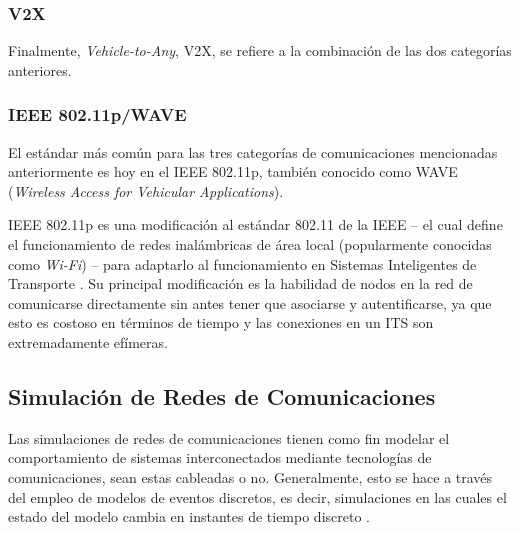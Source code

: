 \subsubsection{V2X}

Finalmente, \emph{Vehicle-to-Any}, V2X, se refiere a la combinación de las dos categorías anteriores.

\subsubsection{IEEE 802.11p/WAVE}\label{sec:its_comms:wave}

El estándar más común para las tres categorías de comunicaciones mencionadas anteriormente es hoy en el IEEE 802.11p, también conocido como WAVE (\emph{Wireless Access for Vehicular Applications}).

IEEE 802.11p es una modificación al estándar 802.11 de la IEEE -- el cual define el funcionamiento de redes inalámbricas de área local (popularmente conocidas como \emph{Wi-Fi}) -- para adaptarlo al funcionamiento en Sistemas Inteligentes de Transporte \autocite{80211wave}. Su principal modificación es la habilidad de nodos en la red de comunicarse directamente sin antes tener que asociarse y autentificarse, ya que esto es costoso en términos de tiempo y las conexiones en un ITS son extremadamente efímeras.


%

\subsection{Simulación de Redes de Comunicaciones}

Las simulaciones de redes de comunicaciones tienen como fin modelar el comportamiento de sistemas interconectados mediante tecnologías de comunicaciones, sean estas cableadas o no. Generalmente, esto se hace a través del empleo de modelos de eventos discretos, es decir, simulaciones en las cuales el estado del modelo cambia en instantes de tiempo discreto \autocite{SchriberDiscreteSim}.

